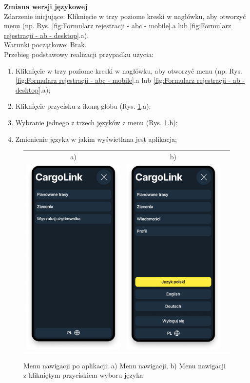 \textbf{Zmiana wersji językowej} \\
Zdarzenie inicjujące: Kliknięcie w trzy poziome kreski w nagłówku, aby otworzyć menu (np. Rys. \ref{fig:Formularz rejestracji - abc - mobile}.a lub \ref{fig:Formularz rejestracji - ab - desktop}.a). \\
Warunki początkowe: Brak. \\
Przebieg podstawowy realizacji przypadku użycia:
\begin{enumerate}
    \item Kliknięcie w trzy poziome kreski w nagłówku, aby otworzyć menu (np. Rys. \ref{fig:Formularz rejestracji - abc - mobile}.a lub \ref{fig:Formularz rejestracji - ab - desktop}.a);
    \item Kliknięcie przycisku z ikoną globu (Rys. \ref{Rys. fig:Menu nawigacji po aplikacji - ab}.a);
    \item Wybranie jednego z trzech języków z menu (Rys. \ref{Rys. fig:Menu nawigacji po aplikacji - ab}.b);
    \item Zmienienie języka w jakim wyświetlana jest aplikacja;
\end{enumerate}
\begin{figure}[H]
	\centering
        \begin{tabular}{@{}ccc@{}}
            a) & b)\\
		\includegraphics[width=0.3\linewidth]{rozdzial1/menu.png} &
		\includegraphics[width=0.3\linewidth]{rozdzial1/menu_język.png}
		\end{tabular}
	\caption{Menu nawigacji po aplikacji: a) Menu nawigacji, b) Menu nawigacji z klikniętym przyciskiem wyboru języka}
	\label{Rys. fig:Menu nawigacji po aplikacji - ab}
\end{figure}


